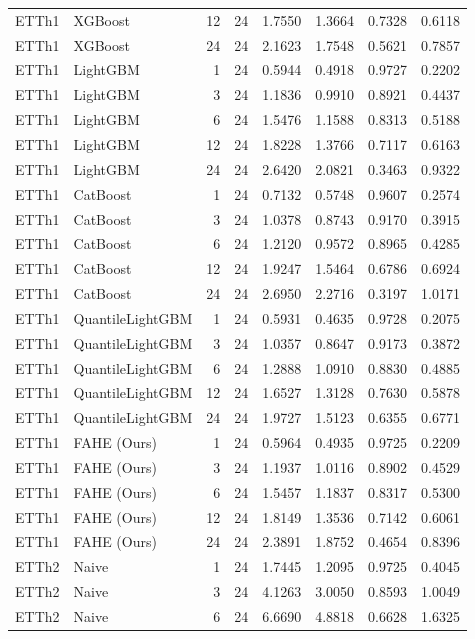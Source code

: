 \begin{tabular}{llrrrrrr}
ETTh1 & XGBoost & 12 & 24 & 1.7550 & 1.3664 & 0.7328 & 0.6118 \\
ETTh1 & XGBoost & 24 & 24 & 2.1623 & 1.7548 & 0.5621 & 0.7857 \\
ETTh1 & LightGBM & 1 & 24 & 0.5944 & 0.4918 & 0.9727 & 0.2202 \\
ETTh1 & LightGBM & 3 & 24 & 1.1836 & 0.9910 & 0.8921 & 0.4437 \\
ETTh1 & LightGBM & 6 & 24 & 1.5476 & 1.1588 & 0.8313 & 0.5188 \\
ETTh1 & LightGBM & 12 & 24 & 1.8228 & 1.3766 & 0.7117 & 0.6163 \\
ETTh1 & LightGBM & 24 & 24 & 2.6420 & 2.0821 & 0.3463 & 0.9322 \\
ETTh1 & CatBoost & 1 & 24 & 0.7132 & 0.5748 & 0.9607 & 0.2574 \\
ETTh1 & CatBoost & 3 & 24 & 1.0378 & 0.8743 & 0.9170 & 0.3915 \\
ETTh1 & CatBoost & 6 & 24 & 1.2120 & 0.9572 & 0.8965 & 0.4285 \\
ETTh1 & CatBoost & 12 & 24 & 1.9247 & 1.5464 & 0.6786 & 0.6924 \\
ETTh1 & CatBoost & 24 & 24 & 2.6950 & 2.2716 & 0.3197 & 1.0171 \\
ETTh1 & QuantileLightGBM & 1 & 24 & 0.5931 & 0.4635 & 0.9728 & 0.2075 \\
ETTh1 & QuantileLightGBM & 3 & 24 & 1.0357 & 0.8647 & 0.9173 & 0.3872 \\
ETTh1 & QuantileLightGBM & 6 & 24 & 1.2888 & 1.0910 & 0.8830 & 0.4885 \\
ETTh1 & QuantileLightGBM & 12 & 24 & 1.6527 & 1.3128 & 0.7630 & 0.5878 \\
ETTh1 & QuantileLightGBM & 24 & 24 & 1.9727 & 1.5123 & 0.6355 & 0.6771 \\
ETTh1 & FAHE (Ours) & 1 & 24 & 0.5964 & 0.4935 & 0.9725 & 0.2209 \\
ETTh1 & FAHE (Ours) & 3 & 24 & 1.1937 & 1.0116 & 0.8902 & 0.4529 \\
ETTh1 & FAHE (Ours) & 6 & 24 & 1.5457 & 1.1837 & 0.8317 & 0.5300 \\
ETTh1 & FAHE (Ours) & 12 & 24 & 1.8149 & 1.3536 & 0.7142 & 0.6061 \\
ETTh1 & FAHE (Ours) & 24 & 24 & 2.3891 & 1.8752 & 0.4654 & 0.8396 \\
ETTh2 & Naive & 1 & 24 & 1.7445 & 1.2095 & 0.9725 & 0.4045 \\
ETTh2 & Naive & 3 & 24 & 4.1263 & 3.0050 & 0.8593 & 1.0049 \\
ETTh2 & Naive & 6 & 24 & 6.6690 & 4.8818 & 0.6628 & 1.6325 \\

\end{tabular}
